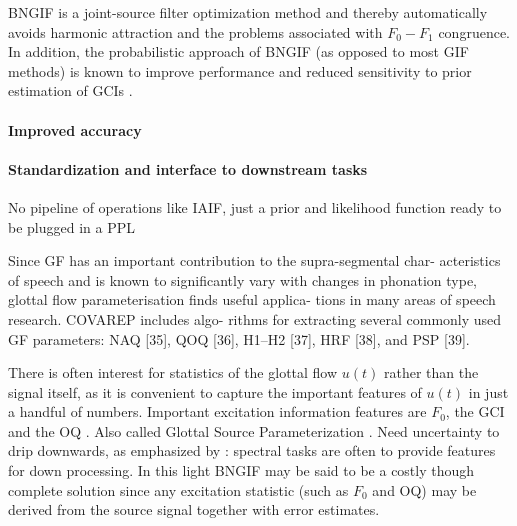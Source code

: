 \begin{chaptersections}
BNGIF is a joint-source filter optimization method and thereby automatically avoids harmonic attraction and the problems associated with $F_0-F_1$ congruence.
In addition, the probabilistic approach of BNGIF (as opposed to most GIF methods) is known to improve performance and reduced sensitivity to prior estimation of GCIs \citep{Auvinen2014,Bleyer2017}.

\paragraph{Improved accuracy}


\paragraph{Standardization and interface to downstream tasks}
No pipeline of operations like IAIF, just a prior and likelihood function ready to be plugged in a PPL

Since GF has an important contribution to the supra-segmental char-
acteristics of speech and is known to signiﬁcantly vary with changes
in phonation type, glottal ﬂow parameterisation ﬁnds useful applica-
tions in many areas of speech research. COVAREP includes algo-
rithms for extracting several commonly used GF parameters: NAQ
[35], QOQ [36], H1–H2 [37], HRF [38], and PSP [39]. \cite{Degottex2014}

There is often interest for statistics of the glottal flow $u(t)$ rather than the signal itself, as it is convenient to capture the important features of $u(t)$ in just a handful of numbers.
Important excitation information features are $F_0$, the GCI and the OQ \citep{Kadiri2021}.
Also called Glottal Source Parameterization \cite{Drugman2019a}.
Need uncertainty to drip downwards, as emphasized by \cite{Turner2014}: spectral tasks are often to provide features for down processing.
In this light BNGIF may be said to be a costly though complete solution since any excitation statistic (such as $F_0$ and OQ) may be derived from the source signal together with error estimates.


\end{chaptersections}
